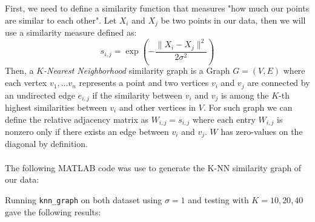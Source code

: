 First, we need to define a similarity function that measures "how much our points are similar to each other". Let \(X_i\) and \(X_j\) be two points in our data, then we will use a similarity measure defined as:
\begin{equation}
  s_{i,j} = \exp \left(- \frac{\| X_i- X_j \|^2}{2\sigma^2}\right)
\end{equation}
Then, a \textit{\(K\)-Nearest Neighborhood} similarity graph is a Graph \(G= (V,E)\) where each vertex \(v_1, \dots v_n\) represents a point and two vertices \(v_i\) and \(v_j\) are connected by an undirected edge \(e_{i,j}\) if the similarity between \(v_i\) and \(v_j\) is among the \(K\)-th highest similarities between \(v_i\) and other vertices in \(V\). For such graph we can define the relative adjacency matrix as \(W_{i,j} = s_{i,j}\) where each entry \(W_{i,j}\) is nonzero only if there exists an edge between \(v_i\) and \(v_j\). \(W\) has zero-values on the diagonal by definition.
\\
\\
The following MATLAB code was use to generate the K-NN similarity graph of our data:

Running \texttt{knn\_graph} on both dataset using \(\sigma= 1\) and testing with \(K= 10, 20, 40\) gave the following results:
